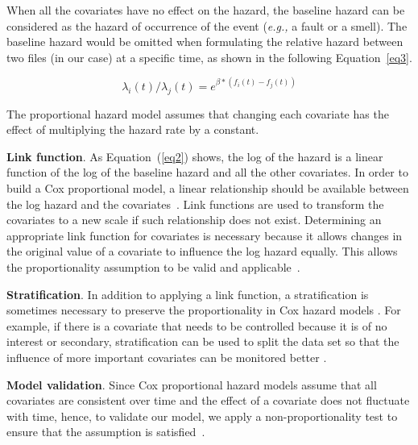 \documentclass[smallcondensed]{svjour3}
\newcommand{\eg}{{\textit{e.g.,}}}
\begin{document}
{When all the covariates have no effect on the hazard, the baseline hazard can be considered as the hazard of occurrence of the event (\eg{} a fault or a smell). The baseline hazard would be omitted when formulating the relative hazard between two files (in our case) at a specific time, as shown in the following Equation~\ref{eq3}.
	
\begin{equation}\label{eq3}
\lambda_{i}(t) \slash \lambda_{j}(t) = e ^ {\beta*{(f_{i}(t) - f_{j}(t))}}
\end{equation}
	
The proportional hazard model assumes that changing each covariate has the effect of multiplying the hazard rate by a constant.
	
	
\textbf{Link function}. As Equation~(\ref{eq2}) shows, the log of the hazard is a linear function of the log of the baseline hazard and all the other covariates. In order to build a Cox proportional model, a linear relationship should be available between the log hazard and the covariates~\cite{therneau2000modeling}. Link functions are used to transform the covariates to a new scale if such relationship does not exist. Determining an appropriate link function for covariates is necessary because it allows changes in the original value of a covariate to influence the log hazard equally. This allows the proportionality assumption to be valid and applicable~\cite{therneau2000modeling}.
	
\textbf{Stratification}. In addition to applying a link function, a stratification is sometimes necessary to preserve the proportionality in Cox hazard models \cite{koru2008theory}. For example, if there is a covariate that needs to be controlled because it is of no interest or secondary, stratification can be used to split the data set so that the influence of more important covariates can be monitored better \cite{koru2008theory}.
	
\textbf{Model validation}. Since Cox proportional hazard models assume that all covariates are consistent over time and the effect of a covariate does not fluctuate with time, hence, to validate our model, we apply a non-proportionality test to ensure that the assumption is satisfied~\cite{selim2010studying}\cite{therneau2000modeling}.
	
}
\end{document}
